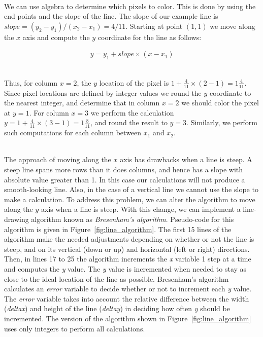 \documentclass[epsfig,10pt,fullpage]{article}
\begin{document}
~\\
\noindent
We can use algebra to determine which pixels to color. This is done by using the end points and 
the slope of the line. The slope of our example line is $slope = (y_2 - y_1)/(x_2 - x_1) = 4/11$. 
Starting at point $(1,1)$ we move along the $x$ axis and compute the $y$ coordinate for the 
line as follows:

\begin{eqnarray*}
y = y_1 + slope \times (x - x_1)
\end{eqnarray*}

~\\
\noindent
Thus, for column $x = 2$, the $y$ location of the pixel is
$1 + \frac{4}{11} \times (2-1) = 1 \frac{4}{11}$. 
Since pixel locations are defined by integer values we round the $y$ coordinate to the nearest 
integer, and determine that in column $x = 2$ we should color the pixel at $y = 1$. For
column $x = 3$ we perform the calculation $y = 1 + \frac{4}{11} \times (3-1) = 1
\frac{8}{11}$, and round the result to $y = 3$.  Similarly, we perform such computations 
for each column between $x_1$ and $x_2$.

~\\
\noindent
The approach of moving along the $x$ axis has drawbacks when a line is steep. A steep line
spans more rows than it does columns, and hence has a slope with absolute value greater than 
1.  In this case our calculations will not produce a smooth-looking line.  Also, in the case
of a vertical line we cannot use the slope to make a calculation.  To address this 
problem, we can alter the algorithm to move along the $y$ axis when a line is steep. With 
this change, we can implement a line-drawing algorithm known as {\it Bresenham's algorithm}.
Pseudo-code for this algorithm is given in Figure~\ref{fig:line_algorithm}. The first 15
lines of the algorithm make the needed adjustments depending on whether or not the line is
steep, and on its vertical (down or up) and horizontal (left or right) directions.
Then, in lines 17 to 25 the algorithm increments the {\it x} variable 1 step at a time
and computes the {\it y} value. The {\it y} value is incremented when needed to stay as
close to the ideal location of the line as possible. Bresenham's algorithm calculates an
{\it error} variable to decide whether or not to increment each {\it y} value.
The {\it error} variable takes into account the relative difference
between the width ({\it deltax}) and height of the line ({\it deltay}) in deciding
how often {\it y} should be incremented. The version of the algorithm shown in 
Figure~\ref{fig:line_algorithm} uses only integers to perform all calculations. 
\end{document}
